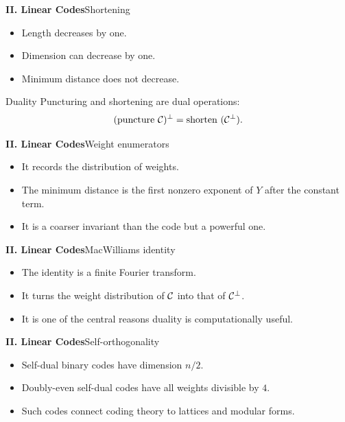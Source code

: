 \begin{frame}{\textbf{II. Linear Codes}}{Shortening}
\small
{}
\begin{itemize}
  \item Length decreases by one.
  \item Dimension can decrease by one.
  \item Minimum distance does not decrease.
\end{itemize}
\begin{block}{Duality}
Puncturing and shortening are dual operations:
\[
  (\text{puncture } \mathcal{C})^\perp=\text{shorten }(\mathcal{C}^\perp).
\]
\end{block}
\end{frame}

\begin{frame}{\textbf{II. Linear Codes}}{Weight enumerators}
\small
{}
\begin{itemize}
  \item It records the distribution of weights.
  \item The minimum distance is the first nonzero exponent of $Y$ after the constant term.
  \item It is a coarser invariant than the code but a powerful one.
\end{itemize}
\end{frame}

\begin{frame}{\textbf{II. Linear Codes}}{MacWilliams identity}
\small
{}
\begin{itemize}
  \item The identity is a finite Fourier transform.
  \item It turns the weight distribution of $\mathcal{C}$ into that of $\mathcal{C}^\perp$.
  \item It is one of the central reasons duality is computationally useful.
\end{itemize}
\end{frame}

\begin{frame}{\textbf{II. Linear Codes}}{Self-orthogonality}
\small
{}
\begin{itemize}
  \item Self-dual binary codes have dimension $n/2$.
  \item Doubly-even self-dual codes have all weights divisible by $4$.
  \item Such codes connect coding theory to lattices and modular forms.
\end{itemize}
\end{frame}

